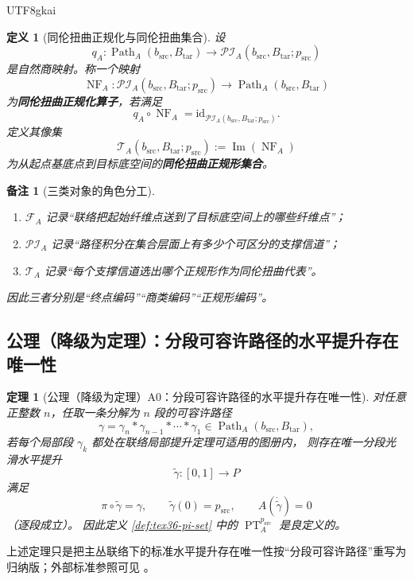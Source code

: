 \documentclass[12pt]{article}
\newtheorem{definition}{定义}[section]
\newtheorem{theorem}{定理}[section]
\newtheorem{remark}{备注}[section]
\newcommand{\Path}{\operatorname{Path}}
\newcommand{\PT}{\operatorname{PT}}
\newcommand{\Img}{\operatorname{Im}}
\newcommand{\NF}{\operatorname{NF}}
\newcommand{\id}{\mathrm{id}}
\begin{document}
\begin{CJK*}{UTF8}{gkai}
\begin{definition}[同伦扭曲正规化与同伦扭曲集合]
\label{def:tex36-twist-set}
设
\[
  q_A:\Path_A(b_{\mathrm{src}},B_{\mathrm{tar}})
  \to
  \mathcal{PI}_{A}(b_{\mathrm{src}},B_{\mathrm{tar}};p_{\mathrm{src}})
\]
是自然商映射。称一个映射
\[
  \NF_A:
  \mathcal{PI}_{A}(b_{\mathrm{src}},B_{\mathrm{tar}};p_{\mathrm{src}})
  \to
  \Path_A(b_{\mathrm{src}},B_{\mathrm{tar}})
\]
为\textbf{同伦扭曲正规化算子}，若满足
\[
  q_A\circ \NF_A=\id_{\mathcal{PI}_{A}(b_{\mathrm{src}},B_{\mathrm{tar}};p_{\mathrm{src}})}.
\]
定义其像集
\[
  \mathcal{T}_{A}(b_{\mathrm{src}},B_{\mathrm{tar}};p_{\mathrm{src}})
  :=
  \Img(\NF_A)
\]
为从起点基底点到目标底空间的\textbf{同伦扭曲正规形集合}。
\end{definition}

\begin{remark}[三类对象的角色分工]
\begin{enumerate}
  \item $\mathcal{F}_{A}$ 记录“联络把起始纤维点送到了目标底空间上的哪些纤维点”；
  \item $\mathcal{PI}_{A}$ 记录“路径积分在集合层面上有多少个可区分的支撑信道”；
  \item $\mathcal{T}_{A}$ 记录“每个支撑信道选出哪个正规形作为同伦扭曲代表”。
\end{enumerate}
因此三者分别是“终点编码”“商类编码”“正规形编码”。
\end{remark}

\subsection{公理（降级为定理）：分段可容许路径的水平提升存在唯一性}
\label{subsec:tex36-axiom-downgraded}

\begin{theorem}[公理（降级为定理）A0：分段可容许路径的水平提升存在唯一性]
\label{thm:tex36-a0}
对任意正整数 $n$，任取一条分解为 $n$ 段的可容许路径
\[
  \gamma=\gamma_n*\gamma_{n-1}*\cdots *\gamma_1
  \in \Path_A(b_{\mathrm{src}},B_{\mathrm{tar}}),
\]
若每个局部段 $\gamma_k$ 都处在联络局部提升定理可适用的图册内，
则存在唯一分段光滑水平提升
\[
  \widetilde{\gamma}:[0,1]\to P
\]
满足
\[
  \pi\circ \widetilde{\gamma}=\gamma,\qquad
  \widetilde{\gamma}(0)=p_{\mathrm{src}},\qquad
  A(\dot{\widetilde{\gamma}})=0
\]
（逐段成立）。
因此定义 \ref{def:tex36-pi-set} 中的 $\PT_A^{p_{\mathrm{src}}}$ 是良定义的。
\end{theorem}

上述定理只是把主丛联络下的标准水平提升存在唯一性按“分段可容许路径”重写为归纳版；外部标准参照可见 \cite{KobayashiNomizu1963Foundations,Husemoller1994FibreBundles}。


\end{CJK*}
\end{document}
